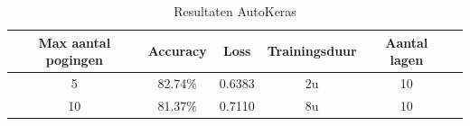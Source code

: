 \begin{table}[ht]
    \centering
    \begin{tabular}{c c c c c c} %
        \hline\hline %
        Max aantal pogingen & Accuracy & Loss & Trainingsduur & Aantal lagen \\ [0.5ex] %
        \hline %
        5   & 82.74\%   & 0.6383   & 2u    & 10 \\ 
        \hline %
        10   & 81.37\%   & 0.7110   & 8u    & 10 \\ 
        \hline
    \end{tabular}
    \caption{Resultaten AutoKeras}
    \label{table:autokeras-results}
\end{table}


